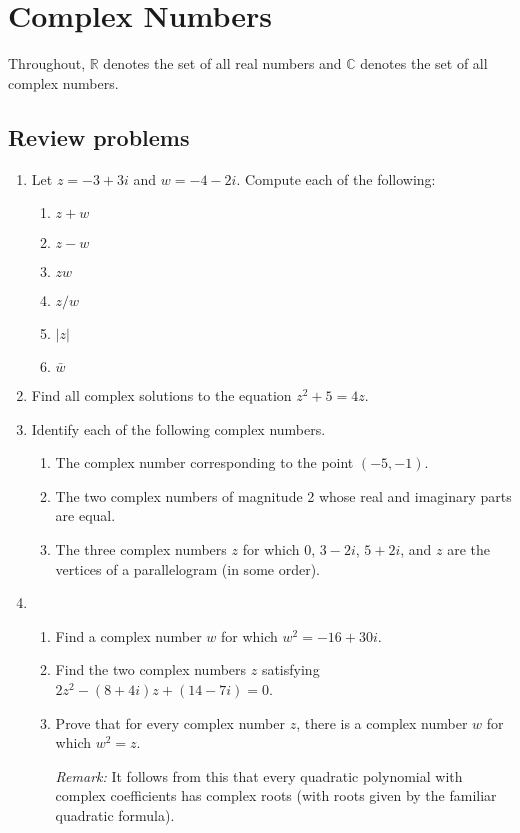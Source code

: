 \section{Complex Numbers}

Throughout, $\mathbb{R}$ denotes the set of all real numbers and $\mathbb{C}$ denotes the set of all complex numbers.

\subsection{Review problems}

\begin{enumerate}
\item Let $z = -3 + 3i$ and $w = -4 - 2i$. Compute each of the following:
\begin{enumerate}
\item $z + w$
\item $z - w$
\item $zw$
\item $z/w$
\item $\lvert z\rvert$
\item $\bar{w}$
\end{enumerate}
\item Find all complex solutions to the equation $z^2 + 5 = 4z$.
\item Identify each of the following complex numbers.
\begin{enumerate}
\item The complex number corresponding to the point $(-5,-1)$.
\item The two complex numbers of magnitude 2 whose real and imaginary parts are equal.
\item The three complex numbers $z$ for which $0$, $3 - 2i$, $5 + 2i$, and $z$ are the vertices of a parallelogram (in some order).
\end{enumerate}
\item \begin{enumerate}
\item Find a complex number $w$ for which $w^2 = -16 + 30i$.
\item Find the two complex numbers $z$ satisfying $2z^2 - (8 + 4i)z + (14 - 7i) = 0$.
\item Prove that for every complex number $z$, there is a complex number $w$ for which $w^2 = z$.\par
\emph{Remark:} It follows from this that every quadratic polynomial with complex coefficients has complex roots (with roots given by the familiar quadratic formula).

\end{enumerate}
\end{enumerate}
